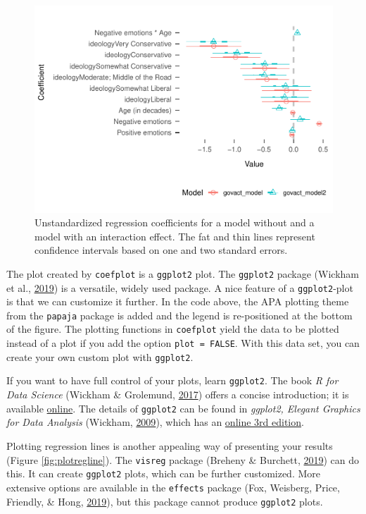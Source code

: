 \documentclass[doc,floatsintext]{apa6}
\begin{document}
\begin{figure}
\centering
\includegraphics{HelpMyCollaboratorUsesR_files/figure-latex/coefplot-1.pdf}
\caption{\label{fig:coefplot}Unstandardized regression coefficients for a
model without and a model with an interaction effect. The fat and thin
lines represent confidence intervals based on one and two standard
errors.}
\end{figure}

The plot created by \texttt{coefplot} is a \texttt{ggplot2} plot. The
\texttt{ggplot2} package (Wickham et al.,
\protect\hyperlink{ref-R-ggplot2}{2019}) is a versatile, widely used
package. A nice feature of a \texttt{ggplot2}-plot is that we can
customize it further. In the code above, the APA plotting theme from the
\texttt{papaja} package is added and the legend is re-positioned at the
bottom of the figure. The plotting functions in \texttt{coefplot} yield
the data to be plotted instead of a plot if you add the option
\texttt{plot\ =\ FALSE}. With this data set, you can create your own
custom plot with \texttt{ggplot2}.

If you want to have full control of your plots, learn \texttt{ggplot2}.
The book \emph{R for Data Science} (Wickham \& Grolemund,
\protect\hyperlink{ref-WickhamDataScienceImport2017}{2017}) offers a
concise introduction; it is available
\href{https://r4ds.had.co.nz/data-visualisation.html}{online}. The
details of \texttt{ggplot2} can be found in \emph{ggplot2, Elegant
Graphics for Data Analysis} (Wickham,
\protect\hyperlink{ref-wickhamGgplot2ElegantGraphics2009}{2009}), which
has an \href{https://ggplot2-book.org/}{online 3rd edition}.

Plotting regression lines is another appealing way of presenting your
results (Figure \ref{fig:plotregline}). The \texttt{visreg} package
(Breheny \& Burchett, \protect\hyperlink{ref-R-visreg}{2019}) can do
this. It can create \texttt{ggplot2} plots, which can be further
customized. More extensive options are available in the \texttt{effects}
package (Fox, Weisberg, Price, Friendly, \& Hong,
\protect\hyperlink{ref-R-effects}{2019}), but this package cannot
produce \texttt{ggplot2} plots.
\end{document}
